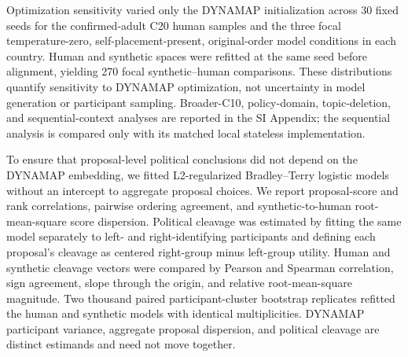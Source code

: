 \documentclass[unnumsec,webpdf,modern,large]{oup-authoring-template}
\begin{document}
Optimization sensitivity varied only the DYNAMAP initialization across 30 fixed seeds for the confirmed-adult C20 human samples and the three focal temperature-zero, self-placement-present, original-order model conditions in each country. Human and synthetic spaces were refitted at the same seed before alignment, yielding 270 focal synthetic--human comparisons. These distributions quantify sensitivity to DYNAMAP optimization, not uncertainty in model generation or participant sampling. Broader-C10, policy-domain, topic-deletion, and sequential-context analyses are reported in the SI Appendix; the sequential analysis is compared only with its matched local stateless implementation.

To ensure that proposal-level political conclusions did not depend on the DYNAMAP embedding, we fitted L2-regularized Bradley--Terry logistic models without an intercept to aggregate proposal choices. We report proposal-score and rank correlations, pairwise ordering agreement, and synthetic-to-human root-mean-square score dispersion. Political cleavage was estimated by fitting the same model separately to left- and right-identifying participants and defining each proposal's cleavage as centered right-group minus left-group utility. Human and synthetic cleavage vectors were compared by Pearson and Spearman correlation, sign agreement, slope through the origin, and relative root-mean-square magnitude. Two thousand paired participant-cluster bootstrap replicates refitted the human and synthetic models with identical multiplicities. DYNAMAP participant variance, aggregate proposal dispersion, and political cleavage are distinct estimands and need not move together.


\end{document}
